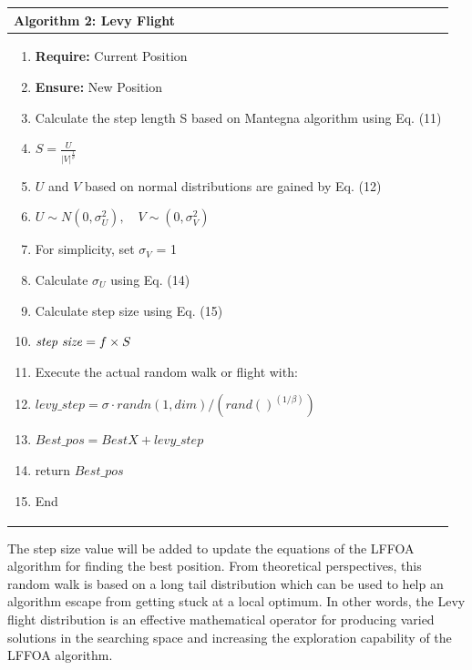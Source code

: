 \documentclass[
]{article}
\begin{document}
\begin{justify}
{\begin{longtable}{@{}p{\dimexpr\linewidth-2\tabcolsep\relax}@{}}
\toprule
\begin{minipage}[b]{\linewidth}
\raggedright
\textbf{Algorithm 2: Levy Flight}
\end{minipage} \\
\midrule
\endhead
\begin{minipage}[t]{\linewidth}
\raggedright
\begin{enumerate}
  \item \textbf{Require:} Current Position
  \item \textbf{Ensure:} New Position
  \item Calculate the step length S based on Mantegna algorithm using Eq. (11)
  \item $S = \frac{U}{|V|^\frac{1}{\theta}}$
  \item $U$ and $V$ based on normal distributions are gained by Eq. (12)
  \item $U \sim N\left(0, \sigma_U^2\right), \quad V \sim \left(0, \sigma_V^2\right)$
  \item For simplicity, set $\sigma_V$ = 1
  \item Calculate $\sigma_U$ using Eq. (14)
  \item Calculate step size using Eq. (15) 
  \item $\text{\textit{step size}} = f \times S$
  \item Execute the actual random walk or flight with:
  \item $levy\_step = \sigma \cdot randn(1, dim) / (rand()^{(1 / \beta)})$
  \item $Best\_pos = BestX + levy\_step$
  \item return $Best\_pos$
  \item End
\end{enumerate}
\end{minipage} \\
\bottomrule
\end{longtable}


The step size value will be added to update the equations of the LFFOA algorithm for finding the best position. From theoretical perspectives, this random walk is based on a long tail distribution which can be used to help an algorithm escape from getting stuck at a local optimum. In other words, the Levy flight distribution is an effective mathematical operator for producing varied solutions in the searching space and increasing the exploration capability of the LFFOA algorithm.

}
\end{justify}
\end{document}

